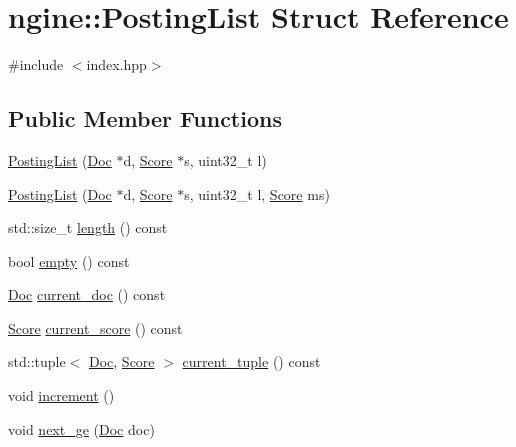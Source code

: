 \hypertarget{structngine_1_1PostingList}{}\section{ngine\+:\+:Posting\+List Struct Reference}
\label{structngine_1_1PostingList}


{\ttfamily \#include $<$index.\+hpp$>$}

\subsection*{Public Member Functions}
\begin{DoxyCompactItemize}
\item 
\hyperlink{structngine_1_1PostingList_ae1fe89ac9f77d8f73083fa71ed3abcfd}{Posting\+List} (\hyperlink{structngine_1_1Doc}{Doc} $\ast$d, \hyperlink{structngine_1_1Score}{Score} $\ast$s, uint32\+\_\+t l)
\item 
\hyperlink{structngine_1_1PostingList_a3c6df1462eaf6e8037871941dc667df8}{Posting\+List} (\hyperlink{structngine_1_1Doc}{Doc} $\ast$d, \hyperlink{structngine_1_1Score}{Score} $\ast$s, uint32\+\_\+t l, \hyperlink{structngine_1_1Score}{Score} ms)
\item 
std\+::size\+\_\+t \hyperlink{structngine_1_1PostingList_a26b18cbed78dd66dab739abef4d8db64}{length} () const
\item 
bool \hyperlink{structngine_1_1PostingList_a1da152c2368b34a2c5d00acae4a57284}{empty} () const
\item 
\hyperlink{structngine_1_1Doc}{Doc} \hyperlink{structngine_1_1PostingList_a25beb7e8eba030e57290f72277ab6893}{current\+\_\+doc} () const
\item 
\hyperlink{structngine_1_1Score}{Score} \hyperlink{structngine_1_1PostingList_a028af2db5a5232f15a12e914c13be902}{current\+\_\+score} () const
\item 
std\+::tuple$<$ \hyperlink{structngine_1_1Doc}{Doc}, \hyperlink{structngine_1_1Score}{Score} $>$ \hyperlink{structngine_1_1PostingList_a4b286d31784bd384865e981e4e27815e}{current\+\_\+tuple} () const
\item 
void \hyperlink{structngine_1_1PostingList_a1420be319189871bbb7f7514dc20a312}{increment} ()
\item 
void \hyperlink{structngine_1_1PostingList_ad4d7f09342e73fd944be41e324ff90c5}{next\+\_\+ge} (\hyperlink{structngine_1_1Doc}{Doc} doc)
\end{DoxyCompactItemize}
